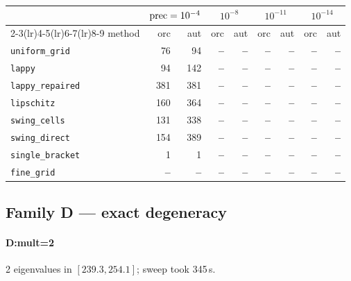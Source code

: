 \begin{center}
\small
\begin{tabular}{lrrrrrrrr}
\toprule
& \multicolumn{2}{c}{$\mathrm{prec}=10^{-4}$} & \multicolumn{2}{c}{$10^{-8}$} & \multicolumn{2}{c}{$10^{-11}$} & \multicolumn{2}{c}{$10^{-14}$} \\
\cmidrule(lr){2-3}\cmidrule(lr){4-5}\cmidrule(lr){6-7}\cmidrule(lr){8-9}
method & orc & aut & orc & aut & orc & aut & orc & aut \\
\midrule
\texttt{uniform\_grid} & 76 & 94 & \textbf{--} & \textbf{--} & \textbf{--} & \textbf{--} & \textbf{--} & \textbf{--} \\
\texttt{lappy} & 94 & 142 & \textbf{--} & \textbf{--} & \textbf{--} & \textbf{--} & \textbf{--} & \textbf{--} \\
\texttt{lappy\_repaired} & 381 & 381 & \textbf{--} & \textbf{--} & \textbf{--} & \textbf{--} & \textbf{--} & \textbf{--} \\
\texttt{lipschitz} & 160 & 364 & \textbf{--} & \textbf{--} & \textbf{--} & \textbf{--} & \textbf{--} & \textbf{--} \\
\texttt{swing\_cells} & 131 & 338 & \textbf{--} & \textbf{--} & \textbf{--} & \textbf{--} & \textbf{--} & \textbf{--} \\
\texttt{swing\_direct} & 154 & 389 & \textbf{--} & \textbf{--} & \textbf{--} & \textbf{--} & \textbf{--} & \textbf{--} \\
\midrule
\texttt{single\_bracket} & 1 & 1 & \textbf{--} & \textbf{--} & \textbf{--} & \textbf{--} & \textbf{--} & \textbf{--} \\
\texttt{fine\_grid} & \textbf{--} & \textbf{--} & \textbf{--} & \textbf{--} & \textbf{--} & \textbf{--} & \textbf{--} & \textbf{--} \\
\bottomrule
\end{tabular}
\end{center}

\subsection{Family D --- exact degeneracy}

\paragraph{D:mult=2} 2 eigenvalues in $[239.3, 254.1]$; sweep took 345\,s.

